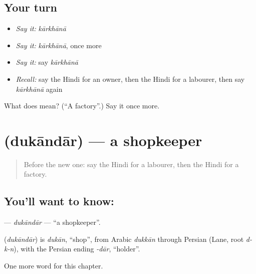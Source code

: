 \subsection*{Your turn}
\begin{itemize}
\raggedright
  \item \emph{Say it:} \emph{kārkhānā}
  \item \emph{Say it:} \emph{kārkhānā}, once more
  \item \emph{Say it:} say \emph{kārkhānā}
  \item \emph{Recall:} say the Hindi for an owner, then the Hindi for a labourer, then say \emph{kārkhānā} again
\end{itemize}

\begin{tcolorbox}[breakable,colback=teal!4,colframe=teal!35!black,title={Before you move on}]
What does  mean? (\textquotedblleft{}A factory\textquotedblright{}.) Say it once more.
\end{tcolorbox}
\section[\texorpdfstring{\hi{दुकानदार} (dukāndār)}{दुकानदार (dukāndār)}]{ (dukāndār) — a shopkeeper}

\label{lesson:HI-C183-dukandar}



\begin{quote}
Before the new one: say the Hindi for a labourer, then the Hindi for a factory.
\end{quote}

\subsection*{You'll want to know: }
\textbf{} — \emph{dukāndār} — \textquotedblleft{}a shopkeeper\textquotedblright{}.

\begin{cousinweb}
\textbf{} (\emph{dukāndār}) is \emph{dukān}, \textquotedblleft{}shop\textquotedblright{}, from Arabic \emph{dukkān} through Persian (Lane, root \emph{d-k-n}), with the Persian ending \emph{-dār}, \textquotedblleft{}holder\textquotedblright{}.
\end{cousinweb}

\begin{grammarlens}[title={What you've built}]
One more word for this chapter.
\end{grammarlens}

